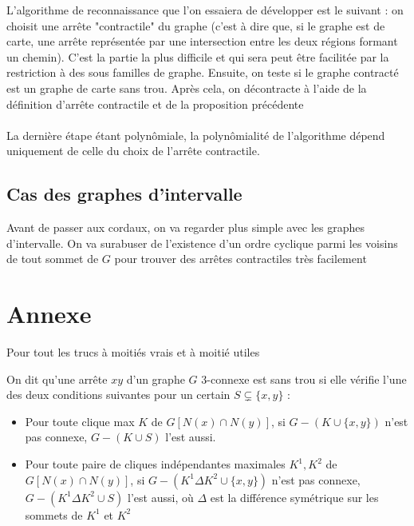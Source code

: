 \documentclass{scrartcl}
\begin{document}
\begin{flushleft}
L'algorithme de reconnaissance que l'on essaiera de développer est le suivant : on choisit une arrête "contractile" du graphe
(c'est à dire que, si le graphe est de carte, une arrête représentée par une intersection entre les deux régions formant
un chemin). C'est la partie la plus difficile et qui sera peut être facilitée par la restriction à des sous familles de graphe.
Ensuite, on teste si le graphe contracté est un graphe de carte sans trou. Après cela, on décontracte à l'aide de la définition
d'arrête contractile et de la proposition précédente
\\~\\
La dernière étape étant polynômiale, la polynômialité de l'algorithme dépend uniquement de celle du choix de l'arrête contractile.

\subsection{Cas des graphes d'intervalle}

Avant de passer aux cordaux, on va regarder plus simple avec les graphes d'intervalle. On va surabuser de l'existence d'un ordre
cyclique parmi les voisins de tout sommet de $G$ pour trouver des arrêtes contractiles très facilement

\section*{Annexe}

Pour tout les trucs à moitiés vrais et à moitié utiles


\begin{def*}
    On dit qu'une arrête $xy$ d'un graphe $G$ $3$-connexe est sans trou si elle vérifie l'une des deux conditions suivantes pour un certain
    $S \subsetneq \{x, y\}$ :
    \begin{itemize}
        \item Pour toute clique max $K$ de $G[N(x) \cap N(y)]$, si $G - (K \cup \{x,y\})$ n'est pas connexe, $G - (K \cup S)$ l'est aussi.
        \item Pour toute paire de cliques indépendantes maximales $K^1, K^2$ de $G[N(x) \cap N(y)]$, si $G - (K^1 \Delta K^2 \cup \{x,y\})$ n'est pas connexe,
        $G - (K^1 \Delta K^2 \cup S)$ l'est aussi, où $\Delta$ est la différence symétrique sur les sommets de $K^1$ et $K^2$
    \end{itemize}
\end{def*}


\end{flushleft}
\end{document}
